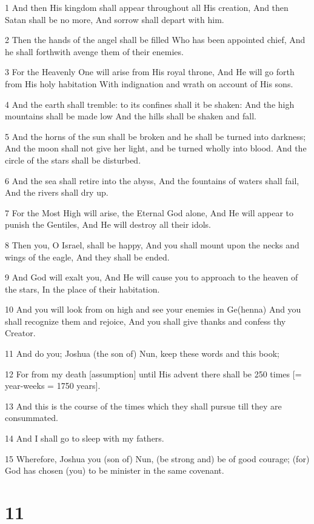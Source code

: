 \par 1 And then His kingdom shall appear throughout all His creation, And then Satan shall be no more, And sorrow shall depart with him.
\par 2 Then the hands of the angel shall be filled Who has been appointed chief, And he shall forthwith avenge them of their enemies.
\par 3 For the Heavenly One will arise from His royal throne, And He will go forth from His holy habitation With indignation and wrath on account of His sons.
\par 4 And the earth shall tremble: to its confines shall it be shaken: And the high mountains shall be made low And the hills shall be shaken and fall.
\par 5 And the horns of the sun shall be broken and he shall be turned into darkness; And the moon shall not give her light, and be turned wholly into blood. And the circle of the stars shall be disturbed.
\par 6 And the sea shall retire into the abyss, And the fountains of waters shall fail, And the rivers shall dry up.
\par 7 For the Most High will arise, the Eternal God alone, And He will appear to punish the Gentiles, And He will destroy all their idols.
\par 8 Then you, O Israel, shall be happy, And you shall mount upon the necks and wings of the eagle, And they shall be ended.
\par 9 And God will exalt you, And He will cause you to approach to the heaven of the stars, In the place of their habitation.
\par 10 And you will look from on high and see your enemies in Ge(henna) And you shall recognize them and rejoice, And you shall give thanks and confess thy Creator.
\par 11 And do you; Joshua (the son of) Nun, keep these words and this book;
\par 12 For from my death [assumption] until His advent there shall be 250 times [= year-weeks = 1750 years].
\par 13 And this is the course of the times which they shall pursue till they are consummated.
\par 14 And I shall go to sleep with my fathers.
\par 15 Wherefore, Joshua you (son of) Nun, (be strong and) be of good courage; (for) God has chosen (you) to be minister in the same covenant.

\chapter{11}

